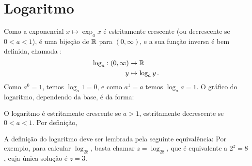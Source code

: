 \section{Logaritmo}
Como a exponencial $x\mapsto \exp_ax$ é estritamente crescente (ou decrescente
se $0<a<1$), é uma bijeção de $\mathbb{R}$ para $(0,\infty)$, e
a sua função inversa é bem definida, chamada :
\begin{align*}
\log_a:(0,\infty)&\to \mathbb{R} \\
y&\mapsto \log_ay\,.
\end{align*}
Como $a^0=1$, temos $\log_a1=0$, e como $a^1=a$ temos $\log_aa=1$.  
O gráfico do logaritmo, dependendo da base, é da forma:
\begin{center}
\begin{bmlimage}\end{bmlimage}
\end{center}
O logaritmo é estritamente crescente se $a>1$, estritamente decrescente se
$0<a<1$.
Por definição,

A definição do logaritmo deve ser lembrada pela seguinte equivalência:
Por exemplo, para calcular $\log_28$, basta chamar $z=\log_28$, que é
equivalente a 
$2^z=8$, cuja única solução é $z=3$.

